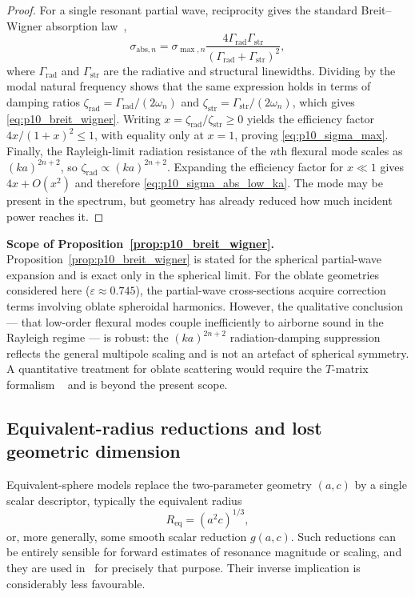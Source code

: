 \begin{proof}
For a single resonant partial wave, reciprocity gives the standard
Breit--Wigner absorption law~\cite{MorseIngard1968},
\begin{equation}
  \sigma_{\mathrm{abs},n}
  =
  \sigma_{\max,n}
  \frac{4\Gamma_\mathrm{rad}\Gamma_\mathrm{str}}
       {(\Gamma_\mathrm{rad}+\Gamma_\mathrm{str})^2},
\end{equation}
where $\Gamma_\mathrm{rad}$ and $\Gamma_\mathrm{str}$ are the radiative and
structural linewidths.  Dividing by the modal natural frequency shows that the
same expression holds in terms of damping ratios
$\zeta_\mathrm{rad}=\Gamma_\mathrm{rad}/(2\omega_n)$ and
$\zeta_\mathrm{str}=\Gamma_\mathrm{str}/(2\omega_n)$, which gives
\eqref{eq:p10_breit_wigner}.  Writing
$x=\zeta_\mathrm{rad}/\zeta_\mathrm{str}\geq 0$ yields the efficiency factor
$4x/(1+x)^2 \leq 1$, with equality only at $x=1$, proving
\eqref{eq:p10_sigma_max}.  Finally, the Rayleigh-limit radiation resistance of
the $n$th flexural mode scales as $(ka)^{2n+2}$, so
$\zeta_\mathrm{rad}\propto(ka)^{2n+2}$.  Expanding the efficiency factor for
$x\ll 1$ gives $4x+O(x^2)$ and therefore \eqref{eq:p10_sigma_abs_low_ka}.  The
mode may be present in the spectrum, but geometry has already reduced how much
incident power reaches it. 
\end{proof}

\noindent\textbf{Scope of Proposition~\ref{prop:p10_breit_wigner}.}
Proposition~\ref{prop:p10_breit_wigner} is stated for the spherical
partial-wave expansion and is exact only in the spherical limit.  For the
oblate geometries considered here ($\varepsilon \approx 0.745$), the
partial-wave cross-sections acquire correction terms involving oblate
spheroidal harmonics.  However, the qualitative conclusion --- that low-order
flexural modes couple inefficiently to airborne sound in the Rayleigh regime
--- is robust: the $(ka)^{2n+2}$ radiation-damping suppression reflects the
general multipole scaling and is not an artefact of spherical symmetry.  A quantitative
treatment for oblate scattering would require the $T$-matrix formalism
~\cite{MorseIngard1968} and is beyond the present scope.

\subsection{Equivalent-radius reductions and lost geometric dimension}

Equivalent-sphere models replace the two-parameter geometry $(a,c)$ by a single
scalar descriptor, typically the equivalent radius
\begin{equation}
  R_\mathrm{eq} = (a^2c)^{1/3},
  \label{eq:p10_req}
\end{equation}
or, more generally, some smooth scalar reduction $g(a,c)$.  Such reductions can
be entirely sensible for forward estimates of resonance magnitude or scaling,
and they are used in~\cite{BrowntoneP1,BrowntoneP7} for precisely that purpose.
Their inverse implication is considerably less favourable.


